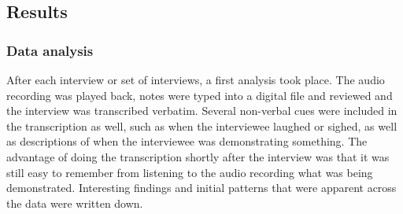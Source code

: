 \subsection{Results}
\subsubsection{Data analysis}
After each interview or set of interviews, a first analysis took place. The audio recording was played back, notes were typed into a digital file and reviewed and the interview was transcribed verbatim. Several non-verbal cues were included in the transcription as well, such as when the interviewee laughed or sighed, as well as descriptions of when the interviewee was demonstrating something. The advantage of doing the transcription shortly after the interview was that it was still easy to remember from listening to the audio recording what was being demonstrated. Interesting findings and initial patterns that were apparent across the data were written down. 

